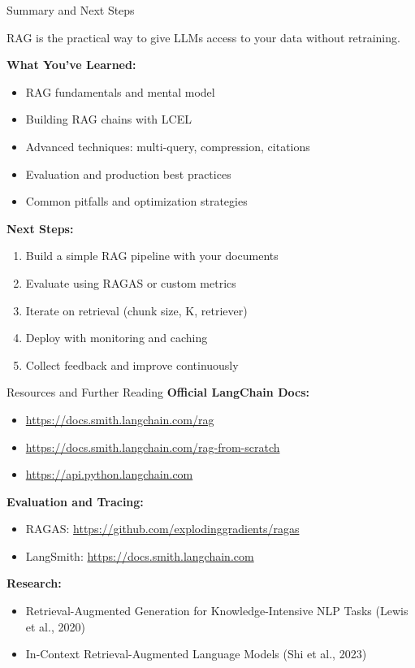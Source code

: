 \documentclass[aspectratio=169,11pt]{beamer}
\begin{document}
\begin{frame}{Summary and Next Steps}
  \begin{conceptbox}
    RAG is the practical way to give LLMs access to your data without retraining.
  \end{conceptbox}

  \textbf{What You've Learned:}
  \begin{itemize}
    \setlength{\itemsep}{1pt}
    \item RAG fundamentals and mental model
    \item Building RAG chains with LCEL
    \item Advanced techniques: multi-query, compression, citations
    \item Evaluation and production best practices
    \item Common pitfalls and optimization strategies
  \end{itemize}

  \textbf{Next Steps:}
  \begin{enumerate}
    \setlength{\itemsep}{0pt}
    \item Build a simple RAG pipeline with your documents
    \item Evaluate using RAGAS or custom metrics
    \item Iterate on retrieval (chunk size, K, retriever)
    \item Deploy with monitoring and caching
    \item Collect feedback and improve continuously
  \end{enumerate}
\end{frame}

\begin{frame}{Resources and Further Reading}
  \textbf{Official LangChain Docs:}
  \begin{itemize}
    \setlength{\itemsep}{1pt}
    \item \url{https://docs.smith.langchain.com/rag}
    \item \url{https://docs.smith.langchain.com/rag-from-scratch}
    \item \url{https://api.python.langchain.com}
  \end{itemize}

  \textbf{Evaluation and Tracing:}
  \begin{itemize}
    \setlength{\itemsep}{1pt}
    \item RAGAS: \url{https://github.com/explodinggradients/ragas}
    \item LangSmith: \url{https://docs.smith.langchain.com}
  \end{itemize}

  \textbf{Research:}
  \begin{itemize}
    \setlength{\itemsep}{1pt}
    \item Retrieval-Augmented Generation for Knowledge-Intensive NLP Tasks (Lewis et al., 2020)
    \item In-Context Retrieval-Augmented Language Models (Shi et al., 2023)
  \end{itemize}
\end{frame}
\end{document}
